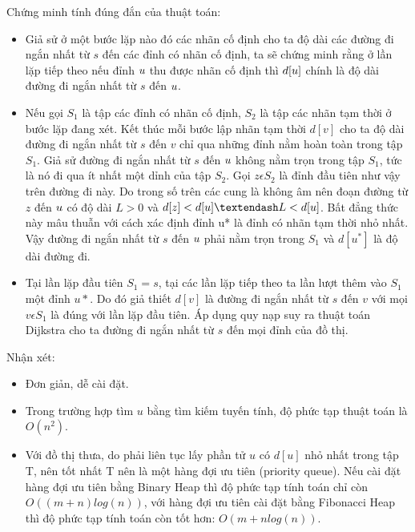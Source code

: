 \documentclass[a4paper,12pt]{report}
\begin{document}
Chứng minh tính đúng đắn của thuật toán:\\
\begin{itemize}

	\item Giả sử ở một bước lặp nào đó các nhãn cố định cho ta độ dài các đường đi ngắn nhất từ $s$ đến các đỉnh có nhãn cố định, ta sẽ chứng minh rằng ở lần lặp tiếp theo nếu đỉnh $ u\* $ thu được nhãn cố định thì $ d[u\*] $ chính là độ dài đường đi ngắn nhất từ $s$ đến $ u\* $.
	\item Nếu gọi $ S_{1} $ là tập các đỉnh có nhãn cố định, $ S_{2} $ là tập các nhãn tạm thời ở bước lặp đang xét. Kết thúc mỗi bước lập nhãn tạm thời $ d[v] $ cho ta độ dài đường đi ngắn nhất từ $s$ đến $v$ chỉ qua những đỉnh nằm hoàn toàn trong tập $ S_{1} $. Giả sử đường đi ngắn nhất từ $s$ đến $ u\* $ không nằm trọn trong tập $ S_{1} $, tức là nó đi qua ít nhất một dỉnh của tập $ S_{2} $. Gọi $ z \epsilon S_{2} $ là đỉnh đầu tiên như vậy trên đường đi này. Do trong số trên các cung là không âm nên đoạn đường từ $z$ đến $ u\* $ có độ dài $ L>0 $ và $ d[z] < d[u\*] – L < d[u\*] $. Bất đẳng thức này mâu thuẫn với cách xác định đỉnh u* là đỉnh có nhãn tạm thời nhỏ nhất. Vậy đường đi ngắn nhất từ $s$ đến $ u\* $ phải nằm trọn trong $ S_{1} $ và $ d[u^{*}] $ là độ dài đường đi.
	\item Tại lần lặp đầu tiên $ S_{1} = {s} $, tại các lần lặp tiếp theo ta lần lượt thêm vào $ S_{1} $ một đỉnh $ u* $. Do đó giả thiết $ d[v] $ là đường đi ngắn nhất từ $s$ đến $v$ với mọi $ v \epsilon S_{1} $ là đúng với lần lặp đầu tiên. Áp dụng quy nạp suy ra thuật toán Dijkstra cho ta đường đi ngắn nhất từ $s$ đến mọi đỉnh của đồ thị.


\end{itemize}

Nhận xét:\\
\begin{itemize}
	\item Đơn giản, dễ cài đặt.
	\item Trong trường hợp tìm $u$ bằng tìm kiếm tuyến tính, độ phức tạp thuật toán là $ O(n^{2}) $.
	\item Với đồ thị thưa, do phải liên tục lấy phần tử $u$ có $d[u]$ nhỏ nhất trong tập T,
            nên tốt nhất T nên là một hàng đợi ưu tiên (priority queue). Nếu
            cài đặt hàng đợi ưu tiên bằng Binary Heap thì độ phức tạp tính toán
            chỉ còn $O((m+n) log(n))$, với hàng đợi ưu tiên cài đặt bằng
            Fibonacci Heap thì độ phức tạp tính toán còn tốt hơn: $O(m + n
            log(n))$.

\end{itemize}
\end{document}
